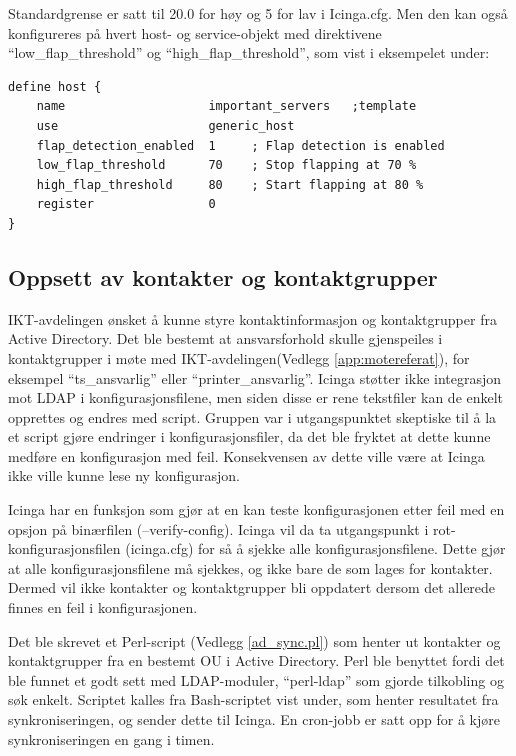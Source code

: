 Standardgrense er satt til 20.0 for høy og 5 for lav i Icinga.cfg. Men den kan også konfigureres på hvert host- og service-objekt med direktivene ``low\_flap\_threshold'' og ``high\_flap\_threshold'', som vist i eksempelet under:
\begin{lstlisting}[style=example]
define host {
    name 					important_servers  	;template
    use						generic_host
    flap_detection_enabled	1     ; Flap detection is enabled
    low_flap_threshold		70    ; Stop flapping at 70 %
    high_flap_threshold		80    ; Start flapping at 80 %
    register				0
}
\end{lstlisting}

\subsection{Oppsett av kontakter og kontaktgrupper}\label{sec:sync}
IKT-avdelingen ønsket å kunne styre kontaktinformasjon og kontaktgrupper fra Active Directory. Det ble bestemt at ansvarsforhold skulle gjenspeiles i kontaktgrupper i møte med IKT-avdelingen(Vedlegg \ref{app:motereferat}), for eksempel ``ts\_ansvarlig'' eller ``printer\_ansvarlig''. Icinga støtter ikke integrasjon mot LDAP i konfigurasjonsfilene, men siden disse er rene tekstfiler kan de enkelt opprettes og endres med script. Gruppen var i utgangspunktet skeptiske til å la et script gjøre endringer i konfigurasjonsfiler, da det ble fryktet at dette kunne medføre en konfigurasjon med feil. Konsekvensen av dette ville være at Icinga ikke ville kunne lese ny konfigurasjon.

Icinga har en funksjon som gjør at en kan teste konfigurasjonen etter feil med en opsjon på binærfilen (--verify-config). Icinga vil da ta utgangspunkt i rot-konfigurasjonsfilen (icinga.cfg) for så å sjekke alle konfigurasjonsfilene. Dette gjør at alle konfigurasjonsfilene må sjekkes, og ikke bare de som lages for kontakter. Dermed vil ikke kontakter og kontaktgrupper bli oppdatert dersom det allerede finnes en feil i konfigurasjonen. 

Det ble skrevet et Perl-script (Vedlegg \ref{ad_sync.pl}) som henter ut kontakter og kontaktgrupper fra en bestemt OU i Active Directory. Perl ble benyttet fordi det ble funnet et godt sett med LDAP-moduler, ``perl-ldap''\cite{perlldap} som gjorde tilkobling og søk enkelt. Scriptet kalles fra Bash-scriptet vist under, som henter resultatet fra synkroniseringen, og sender dette til Icinga. En cron-jobb er satt opp for å kjøre synkroniseringen en gang i timen.

